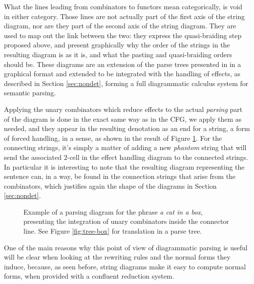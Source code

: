 \medskip

What the lines leading from combinators to functors mean categorically, is
void in either category.
Those lines are not actually part of the first axis of the string diagram,
nor are they part of the second axis of the string diagram.
They are used to map out the link between the two: they express the
quasi-braiding step proposed above, and present graphically why the order of
the strings in the resulting diagram is as it is, and what the pasting and
quasi-braiding orders should be.
These diagrams are an extension of the parse trees presented in
\cite{bumfordEffectdrivenInterpretationFunctors2025} in a graphical format and
extended to be integrated with the handling of effects, as described in Section
\ref{sec:nondet}, forming a full diagrammatic calculus system for semantic
parsing.

\medskip

Applying the unary combinators which reduce effects to the actual
\emph{parsing} part of the diagram is done in the exact same way as in the CFG,
we apply them as needed, and they appear in the resulting
denotation as an end for a string, a form of forced handling, in a sense, as
shown in the result of Figure \ref{fig:parsing-diagram2}.
For the connecting strings, it's simply a matter of adding a new \emph{phantom}
string that will send the associated $2$-cell in the effect handling diagram to
the connected strings.
In particular it is interesting to note that the resulting diagram representing
the sentence can, in a way, be found in the connection strings that arise from
the combinators, which justifies again the shape of the diagrams in Section
\ref{sec:nondet}.

\begin{figure}
	\centering
	\caption{Example of a parsing diagram for the phrase
		\emph{a cat in a box}, presenting the integration of unary combinators
		inside the connector line.
		See Figure \ref{fig:tree-box} for translation in a parse tree.}
	\label{fig:parsing-diagram2}
\end{figure}

One of the main reasons why this point of view of diagrammatic parsing is
useful will be clear when looking at the rewriting rules and the normal forms
they induce, because, as seen before, string diagrams make it easy to compute
normal forms, when provided with a confluent reduction system.

